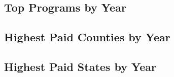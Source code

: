 \documentclass{article}
\begin{document}
\newpage

\subsection*{Top Programs by Year}


\newpage

\subsection*{Highest Paid Counties by Year}


\subsection*{Highest Paid States by Year}



\newpage


\end{document}
